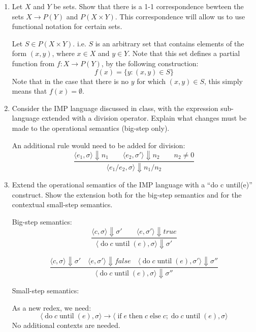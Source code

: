 \documentclass{article}
\begin{document}
\begin{enumerate}
  \item Let $X$ and $Y$ be sets. Show that there is a 1-1 correspondence bewteen
  the sets $X \rightarrow P(Y)$ and $P(X \times Y )$. This correspondence will
  allow us to use functional notation for certain sets.
  
  Let $S \in P(X \times Y)$. i.e. $S$ is an arbitrary set that contains elements
  of the form $(x,y)$, where $x \in X$ and $y \in Y$.  Note that this set
  defines a partial function from $f : X \rightarrow P(Y)$, by the following
  construction:
  \[
  f(x) = \{ y : (x,y) \in S \}
  \]
  Note that in the case that there is no $y$ for which $(x,y) \in S$, this
  simply means that $f(x) = \emptyset$.
  
  \item Consider the IMP language discussed in class, with the expression
  sub-language extended with a division operator. Explain what changes must be
  made to the operational semantics (big-step only).
  
  An additional rule would need to be added for division:
  \[\frac{
  \langle e_1, \sigma \rangle \Downarrow n_1   \qquad
  \langle e_2, \sigma' \rangle \Downarrow n_2  \qquad
  n_2 \ne 0 }
  {\langle e_1 / e_2, \sigma \rangle \Downarrow n_1 / n_2}
  \]
  
  \item Extend the operational semantics of the IMP language with a ``do c
  until(e)'' construct. Show the extension both for the big-step semantics and
  for the contextual small-step semantics.
  \newcommand{\dountil}[2]{\operatorname{do} #1 \operatorname{until}(#2)}
  \newcommand{\ifthenelse}[3]{\operatorname{if} #1 \operatorname{then} #2 \operatorname{else} #3}
  
  Big-step semantics:
  \[\frac{
  \langle c, \sigma \rangle \Downarrow \sigma'   \qquad
  \langle e, \sigma' \rangle \Downarrow true }
  {\langle \dountil{c}{e}, \sigma \rangle \Downarrow \sigma'}
  \]

  \[\frac{
  \langle c, \sigma \rangle \Downarrow \sigma'   \quad
  \langle e, \sigma' \rangle \Downarrow false    \quad
  \langle \dountil{c}{e}, \sigma' \rangle \Downarrow \sigma'' }
  {\langle \dountil{c}{e}, \sigma \rangle \Downarrow \sigma'' }
  \]

  Small-step semantics:

  As a new redex, we need:
  \[
  \langle \dountil{c}{e}, \sigma \rangle \rightarrow
          \langle \ifthenelse{e}{c}{c;\dountil{c}{e}}, \sigma \rangle
  \]
  No additional contexts are needed.



\end{enumerate}
\end{document}
